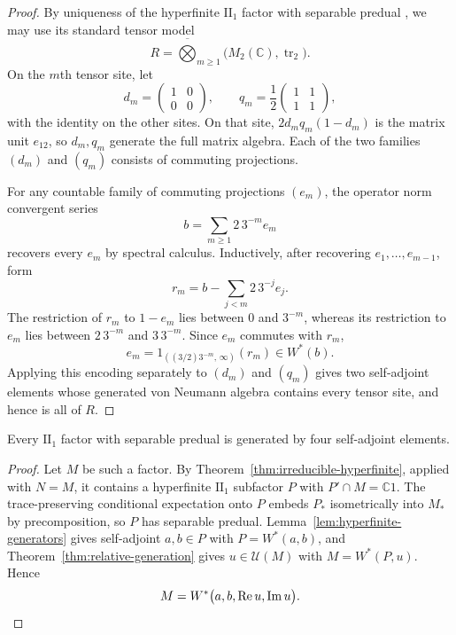 \begin{proof}
By uniqueness of the hyperfinite $\mathrm{II}_1$ factor with separable
predual \cite[Section~1.3]{Popa2014}, we may use its standard tensor model
\[
 R=\overline{\bigotimes}_{m\geq1}
 \bigl(M_2(\mathbb C),\operatorname{tr}_2\bigr).
\]
On the $m$th tensor site, let
\[
 d_m=\begin{pmatrix}1&0\\0&0\end{pmatrix},\qquad
 q_m=\frac12\begin{pmatrix}1&1\\1&1\end{pmatrix},
\]
with the identity on the other sites. On that site,
$2d_mq_m(1-d_m)$ is the matrix unit $e_{12}$, so $d_m,q_m$
generate the full matrix algebra. Each of the two families
$(d_m)$ and $(q_m)$ consists of commuting projections.

For any countable family of commuting projections $(e_m)$, the
operator norm convergent series
\[
 b=\sum_{m\geq1}2\,3^{-m}e_m
\]
recovers every $e_m$ by spectral calculus. Inductively, after
recovering $e_1,\ldots,e_{m-1}$, form
\[
 r_m=b-\sum_{j<m}2\,3^{-j}e_j.
\]
The restriction of $r_m$ to $1-e_m$ lies between $0$ and $3^{-m}$,
whereas its restriction to $e_m$ lies between $2\,3^{-m}$ and
$3\,3^{-m}$. Since $e_m$ commutes with $r_m$,
\[
 e_m=1_{((3/2)3^{-m},\,\infty)}(r_m)\in W^*(b).
\]
Applying this encoding separately to $(d_m)$ and $(q_m)$ gives
two self-adjoint elements whose generated von Neumann algebra
contains every tensor site, and hence is all of $R$.
\end{proof}

\begin{proposition}
\label{prop:four-generators}
Every $\mathrm{II}_1$ factor with separable predual is generated
by four self-adjoint elements.
\end{proposition}

\begin{proof}
Let $M$ be such a factor. By
Theorem~\ref{thm:irreducible-hyperfinite}, applied with $N=M$, it contains a hyperfinite
$\mathrm{II}_1$ subfactor $P$ with $P'\cap M=\mathbb C1$.
The trace-preserving conditional expectation onto $P$ embeds
$P_*$ isometrically into $M_*$ by precomposition, so $P$ has
separable predual. Lemma~\ref{lem:hyperfinite-generators} gives
self-adjoint $a,b\in P$ with $P=W^*(a,b)$, and
Theorem~\ref{thm:relative-generation} gives $u\in\mathcal U(M)$
with $M=W^*(P,u)$. Hence
\[
 M=W^*\bigl(a,b,\operatorname{Re}u,\operatorname{Im}u\bigr).\qedhere
\]
\end{proof}

